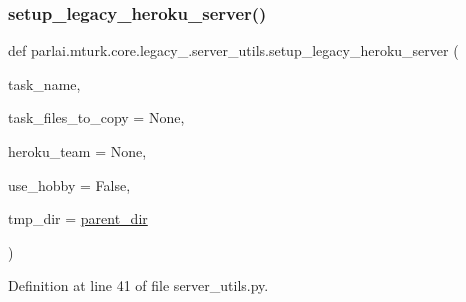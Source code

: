\subsubsection{\texorpdfstring{setup\+\_\+legacy\+\_\+heroku\+\_\+server()}{setup\_legacy\_heroku\_server()}}
{\footnotesize\ttfamily def parlai.\+mturk.\+core.\+legacy\+\_.\+server\+\_\+utils.\+setup\+\_\+legacy\+\_\+heroku\+\_\+server (\begin{DoxyParamCaption}\item[{}]{task\+\_\+name,  }\item[{}]{task\+\_\+files\+\_\+to\+\_\+copy = {\ttfamily None},  }\item[{}]{heroku\+\_\+team = {\ttfamily None},  }\item[{}]{use\+\_\+hobby = {\ttfamily False},  }\item[{}]{tmp\+\_\+dir = {\ttfamily \hyperlink{namespaceparlai_1_1mturk_1_1core_1_1legacy__2018_1_1server__utils_a6a871d2f8e5c0768a82ab8fa2e7fadae}{parent\+\_\+dir}} }\end{DoxyParamCaption})}



Definition at line 41 of file server\+\_\+utils.\+py.


